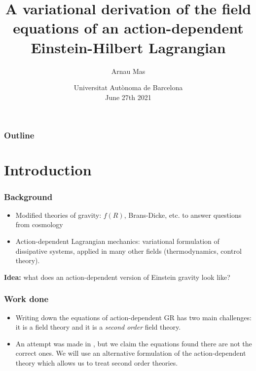 \documentclass[xcolor=dvipsnames]{beamer}
\title[Action-dependent gravitation]{\bfseries{A variational derivation of the field
equations of an action-dependent Einstein-Hilbert Lagrangian}}
\author[Arnau Mas]{Arnau Mas}
\institute[]{\footnotesize{\itshape{Supervised by}} \\ Dr Jordi Gaset}
\date[UAB, Jun 27th 2021]{\small Universitat Autònoma de Barcelona \\ June 27th 2021}
\begin{document}
\begin{frame}[plain]
	\titlepage
\end{frame}



\AtEndDocument{
	\begin{frame}[plain]
		\titlepage
	\end{frame}
}


\begin{frame}
	\frametitle{Outline}
	\tableofcontents
\end{frame}

\section{Introduction}
\begin{frame}
	\frametitle{Background}
	\begin{itemize}
		\pause
		\item Modified theories of gravity: \( f(R) \), Brans-Dicke, etc. to answer questions
			from cosmology
			\pause
		\item Action-dependent Lagrangian mechanics: variational formulation of dissipative
			systems, applied in many other fields (thermodynamics, control theory).
	\end{itemize}
	\pause
	\textbf{Idea:} what does an action-dependent version of Einstein gravity look like?
\end{frame}

\begin{frame}
	\frametitle{Work done}
	\begin{itemize}
		\pause
		\item	Writing down the equations of action-dependent GR has two main challenges: it
			is a field theory and it is a \emph{second order} field theory. 
			\pause
		\item	An attempt was made in \cite{Lazo2018}, but we claim the equations found there
			are not the correct ones. We will use an alternative formulation of the
			action-dependent theory which allows us to treat second order theories. 
	\end{itemize}

\end{frame}
\end{document}
